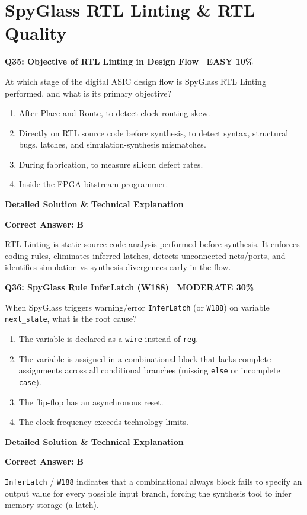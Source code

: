 \documentclass[11pt,a4paper]{article}
\newcommand{\badgemod}{{\color{white}\colorbox{modoran}{\bfseries\sffamily\tiny\ MODERATE 30\%\ }}}
\newcommand{\badgeeasy}{{\color{white}\colorbox{easygreen}{\bfseries\sffamily\tiny\ EASY 10\%\ }}}
\newenvironment{qbox}[2]{%
  \begin{mdframed}[style=qstyle]%
  {\bfseries\sffamily\color{primaryblue}#1 \hfill #2}\par\vspace{2pt}%
}{%
  \end{mdframed}%
}
\newenvironment{ansbox}{%
  \begin{mdframed}[style=ansstyle]%
  {\bfseries\sffamily\color{ansgreen}\small Detailed Solution \& Technical Explanation}\par\vspace{2pt}\small%
}{%
  \end{mdframed}%
}
\begin{document}
\section{SpyGlass RTL Linting \& RTL Quality}

\begin{qbox}{Q35: Objective of RTL Linting in Design Flow}{\badgeeasy}
At which stage of the digital ASIC design flow is SpyGlass RTL Linting performed, and what is its primary objective?
\begin{enumerate}[label=\textbf{\Alph*.}]
  \item After Place-and-Route, to detect clock routing skew.
  \item Directly on RTL source code before synthesis, to detect syntax, structural bugs, latches, and simulation-synthesis mismatches.
  \item During fabrication, to measure silicon defect rates.
  \item Inside the FPGA bitstream programmer.
\end{enumerate}
\end{qbox}
\begin{ansbox}
\textbf{Correct Answer: B}

RTL Linting is static source code analysis performed before synthesis. It enforces coding rules, eliminates inferred latches, detects unconnected nets/ports, and identifies simulation-vs-synthesis divergences early in the flow.
\end{ansbox}

\begin{qbox}{Q36: SpyGlass Rule InferLatch (W188)}{\badgemod}
When SpyGlass triggers warning/error \texttt{InferLatch} (or \texttt{W188}) on variable \texttt{next\_state}, what is the root cause?
\begin{enumerate}[label=\textbf{\Alph*.}]
  \item The variable is declared as a \texttt{wire} instead of \texttt{reg}.
  \item The variable is assigned in a combinational block that lacks complete assignments across all conditional branches (missing \texttt{else} or incomplete \texttt{case}).
  \item The flip-flop has an asynchronous reset.
  \item The clock frequency exceeds technology limits.
\end{enumerate}
\end{qbox}
\begin{ansbox}
\textbf{Correct Answer: B}

\texttt{InferLatch} / \texttt{W188} indicates that a combinational always block fails to specify an output value for every possible input branch, forcing the synthesis tool to infer memory storage (a latch).
\end{ansbox}
\end{document}
